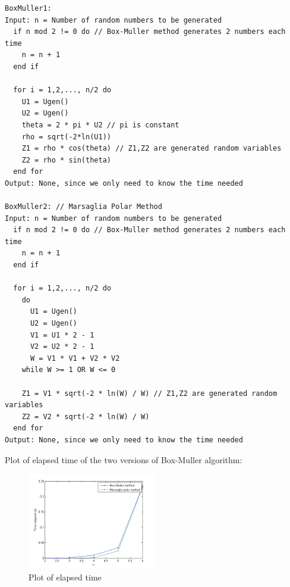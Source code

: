 \documentclass[a4paper]{article}
\begin{document}
\begin{enumerate}
\begin{verbatim}
BoxMuller1:
Input: n = Number of random numbers to be generated
  if n mod 2 != 0 do // Box-Muller method generates 2 numbers each time
    n = n + 1
  end if
  
  for i = 1,2,..., n/2 do
    U1 = Ugen()
    U2 = Ugen()
    theta = 2 * pi * U2 // pi is constant
    rho = sqrt(-2*ln(U1))
    Z1 = rho * cos(theta) // Z1,Z2 are generated random variables
    Z2 = rho * sin(theta)
  end for
Output: None, since we only need to know the time needed

BoxMuller2: // Marsaglia Polar Method
Input: n = Number of random numbers to be generated
  if n mod 2 != 0 do // Box-Muller method generates 2 numbers each time
    n = n + 1
  end if
  
  for i = 1,2,..., n/2 do
    do
      U1 = Ugen()
      U2 = Ugen()
      V1 = U1 * 2 - 1
      V2 = U2 * 2 - 1
      W = V1 * V1 + V2 * V2
    while W >= 1 OR W <= 0
    
    Z1 = V1 * sqrt(-2 * ln(W) / W) // Z1,Z2 are generated random variables
    Z2 = V2 * sqrt(-2 * ln(W) / W)
  end for
Output: None, since we only need to know the time needed
\end{verbatim}

Plot of elapsed time of the two versions of Box-Muller algorithm:\\
\begin{figure}[ht]
\centering
\includegraphics[width=0.5\textwidth]{Q13fig01.png}
\caption{\label{fig:fig01} Plot of elapsed time}
\end{figure}

\end{enumerate}
\end{document}
